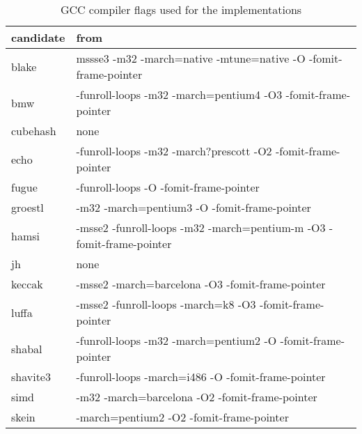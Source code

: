\begin{table}
  \centering
  \begin{tabular}{ | l | l | }
    \hline
    \textbf{candidate} & \textbf{from}  \\ \hline
     blake       & mssse3 -m32 -march=native -mtune=native -O -fomit-frame-pointer  \\ \hline
     bmw         & -funroll-loops -m32 -march=pentium4 -O3 -fomit-frame-pointer     \\ \hline
     cubehash    & none                                                             \\ \hline
     echo        & -funroll-loops -m32 -march?prescott -O2 -fomit-frame-pointer     \\ \hline
     fugue       & -funroll-loops -O -fomit-frame-pointer                           \\ \hline
     groestl     & -m32 -march=pentium3 -O -fomit-frame-pointer                     \\ \hline
     hamsi       & -msse2 -funroll-loops -m32 -march=pentium-m -O3 -fomit-frame-pointer\\ \hline
     jh          & none                                                             \\ \hline
     keccak      & -msse2 -march=barcelona -O3 -fomit-frame-pointer                 \\ \hline
     luffa       & -msse2 -funroll-loops -march=k8 -O3 -fomit-frame-pointer         \\ \hline
     shabal      & -funroll-loops -m32 -march=pentium2 -O -fomit-frame-pointer      \\ \hline
     shavite3    & -funroll-loops -march=i486 -O -fomit-frame-pointer               \\ \hline
     simd        & -m32 -march=barcelona -O2 -fomit-frame-pointer                   \\ \hline
     skein       & -march=pentium2 -O2 -fomit-frame-pointer                         \\ \hline
  \end{tabular}
  \caption{\ac{GCC} compiler flags used for the implementations}
  \label{tbl:sha:compilerflags}
\end{table}

